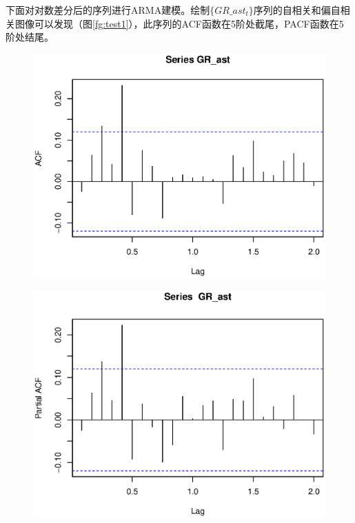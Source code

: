 \documentclass[10.5pt,onecolumn,a4paper]{article}%
\begin{document}
下面对对数差分后的序列进行ARMA建模。绘制$\{GR\_ast_t\}$序列的自相关和偏自相关图像可以发现（图\ref{fg:test1}），此序列的ACF函数在5阶处截尾，PACF函数在5阶处结尾。
{}

\begin{figure}[h!]
\label{fg:test1}
\begin{multicols}{2}  
    \begin{minipage}[h]{0.5\textwidth} 
        \centering   
        \includegraphics[width=1\textwidth]{pic/acf(gr_ast)}   
           \label{fig:apegrast:a}   
    \end{minipage}
    \begin{minipage}[h]{0.5\textwidth}   
        \centering   
        \includegraphics[width=1\textwidth]{pic/pacf(gr_ast)}   
        \label{fig:pierce:b}   
    \end{minipage}



\end{multicols}
\end{figure}
\end{document}
